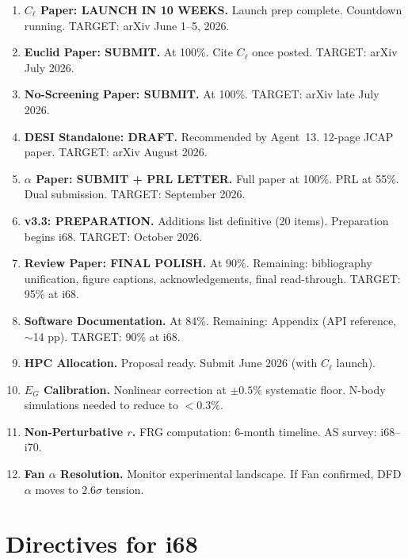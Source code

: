 \documentclass[11pt,a4paper]{article}
\begin{document}
\begin{enumerate}[label=\textbf{P\arabic*.}]
\item \textbf{$C_\ell$ Paper: LAUNCH IN 10 WEEKS.} Launch prep complete. Countdown running. TARGET: arXiv June 1--5, 2026.

\item \textbf{Euclid Paper: SUBMIT.} At 100\%. Cite $C_\ell$ once posted. TARGET: arXiv July 2026.

\item \textbf{No-Screening Paper: SUBMIT.} At 100\%. TARGET: arXiv late July 2026.

\item \textbf{DESI Standalone: DRAFT.} Recommended by Agent~13. 12-page JCAP paper. TARGET: arXiv August 2026.

\item \textbf{$\alpha$ Paper: SUBMIT + PRL LETTER.} Full paper at 100\%. PRL at 55\%. Dual submission. TARGET: September 2026.

\item \textbf{v3.3: PREPARATION.} Additions list definitive (20 items). Preparation begins i68. TARGET: October 2026.

\item \textbf{Review Paper: FINAL POLISH.} At 90\%. Remaining: bibliography unification, figure captions, acknowledgements, final read-through. TARGET: 95\% at i68.

\item \textbf{Software Documentation.} At 84\%. Remaining: Appendix (API reference, $\sim$14 pp). TARGET: 90\% at i68.

\item \textbf{HPC Allocation.} Proposal ready. Submit June 2026 (with $C_\ell$ launch).

\item \textbf{$E_G$ Calibration.} Nonlinear correction at $\pm 0.5\%$ systematic floor. N-body simulations needed to reduce to $< 0.3\%$.

\item \textbf{Non-Perturbative $r$.} FRG computation: 6-month timeline. AS survey: i68--i70.

\item \textbf{Fan $\alpha$ Resolution.} Monitor experimental landscape. If Fan confirmed, DFD $\alpha$ moves to $2.6\sigma$ tension.
\end{enumerate}


\section{Directives for i68}
\label{sec:directives}
\end{document}

